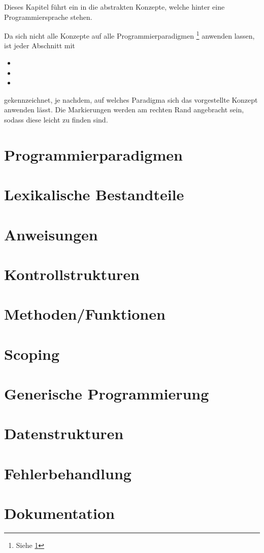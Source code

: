 Dieses Kapitel führt ein in die abstrakten Konzepte, welche hinter eine Programmiersprache stehen.

Da sich nicht alle Konzepte auf alle Programmierparadigmen \footnote{Siehe \ref{sec:paradigmen}} anwenden lassen, ist jeder Abschnitt mit
\begin{itemize}
	\item[] \functional
	\item[] \imperative
	\item[] \oop
\end{itemize}
gekennzeichnet, je nachdem, auf welches Paradigma sich das vorgestellte Konzept anwenden lässt. Die Markierungen werden am rechten Rand angebracht sein, sodass diese leicht zu finden sind.

\section{Programmierparadigmen}
	\label{sec:paradigmen}
	
	

\section{Lexikalische Bestandteile}
	

\section{Anweisungen}
	

\section{Kontrollstrukturen}
	

\section{Methoden/Funktionen}
	

\section{Scoping}
	

\section{Generische Programmierung}
	

\section{Datenstrukturen}
	

\section{Fehlerbehandlung}
	

\section{Dokumentation}
	
